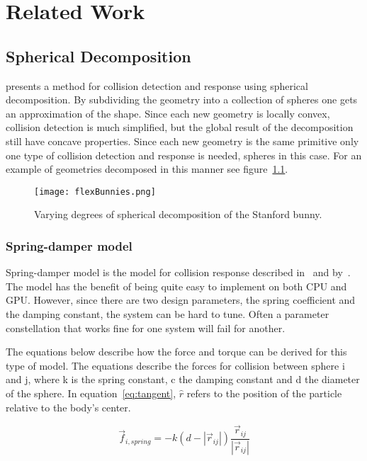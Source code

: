 \chapter{Related Work}\label{cha:related}

\section{Spherical Decomposition}\label{sec:decomp}
\cite{gpugems} presents a method for collision detection and response using spherical
decomposition. By subdividing the geometry into a collection of spheres one gets an
approximation of the shape. Since each new geometry is locally convex, collision
detection is much simplified, but the global result of the decomposition still have
concave properties. Since each new geometry is the same primitive only
one type of collision detection and response is needed, spheres in this case.
For an example of geometries
decomposed in this manner see figure~\ref{fig:bunnies}.

\begin{figure}[H]
  \centering
  \texttt{[image: flexBunnies.png]}
  \caption{Varying degrees of spherical decomposition of the Stanford bunny.}
  \label{fig:bunnies}
\end{figure}

\subsection{Spring-damper model}
Spring-damper model is the model for collision response described in~\cite{gpugems} and by~\cite{fossum}.
The model has the benefit of being quite easy to implement on both CPU and GPU.
However, since there are two design parameters, the spring coefficient and the damping
constant, the system can be hard to tune. Often a parameter constellation that works
fine for one system will fail for another.

The equations below describe how the force and torque can be derived for this type
of model. The equations describe the forces for collision between sphere i and j,
where k is the spring constant, c the damping constant and d the
diameter of the sphere. In equation~\ref{eq:tangent}, $\hat{r}$ refers to the
position of the particle relative to the body's center.

\begin{equation}
  \vec{f}_{i,spring} = -k(d-|\vec{r}_{ij}|)\frac{\vec{r}_{ij}}{|\vec{r}_{ij}|}
\end{equation}


